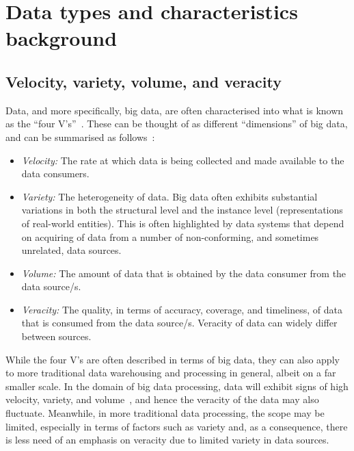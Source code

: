 \documentclass[a4paper,11pt]{article}
\begin{document}


\section{Data types and characteristics background} %
\label{sec:big_data_types_background}

\subsection{Velocity, variety, volume, and veracity} %
\label{sub:four_v}

Data, and more specifically, big data, are often characterised into what is known as the ``four V's''~\cite{wang2014bigdatabench}.
These can be thought of as different ``dimensions'' of big data, and can be summarised as follows~\cite{dong2013big}:

\begin{itemize}
  \item \emph{Velocity:} The rate at which data is being collected and made available to the data consumers.
  \item \emph{Variety:} The heterogeneity of data. Big data often exhibits substantial variations in both the structural
  level and the instance level (representations of real-world entities). This is often highlighted by data systems that
  depend on acquiring of data from a number of non-conforming, and sometimes unrelated, data sources.
  \item \emph{Volume:} The amount of data that is obtained by the data consumer from the data source/s.
  \item \emph{Veracity:} The quality, in terms of accuracy, coverage, and timeliness, of data that is consumed from
  the data source/s. Veracity of data can widely differ between sources.
\end{itemize}

While the four V's are often described in terms of big data, they can also apply to more traditional data
warehousing and processing in general, albeit on a far smaller scale. In the domain of big data processing, data will
exhibit signs of high velocity, variety, and volume~\cite{beyer2011gartner}, and hence the veracity of the data may also fluctuate. Meanwhile,
in more traditional data processing, the scope may be limited, especially in terms of factors such as variety and, as a
consequence, there is less need of an emphasis on veracity due to limited variety in data sources.
\end{document}
